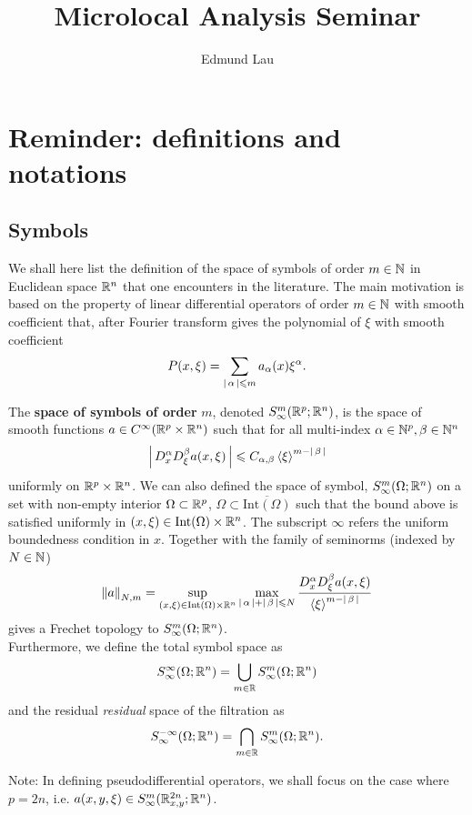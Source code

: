\documentclass{article}
\title{Microlocal Analysis Seminar }
\author{Edmund Lau}
\begin{document}
\maketitle
\tableofcontents
\pagebreak
\section{Reminder: definitions and notations}
\subsection{Symbols} 
We shall here list the definition of the space of symbols of order $m \in \N$  in Euclidean space $\R^n$ that one encounters in the literature. The main motivation is based on the property of linear differential operators of order $m \in \N$ with smooth coefficient that, after Fourier transform gives the polynomial of $\xi$ with smooth coefficient 
\begin{align*}
P(x, \xi) = \sum_{\abs{\alpha} \leq m} a_\alpha(x) \xi^\alpha. 
\end{align*}


\begin{fdefinition}
    The \textbf{space of symbols of order} $m$, denoted $S^m_\infty(\R^p; \R^n)$, is the space of smooth functions $a \in C^\infty(\R^p \times \R^n)$ such that for all multi-index $\alpha \in \N^p, \beta \in \N^n$
    \begin{align*}
    \abs{D^\alpha_x D^\beta_\xi a (x, \xi)} \leq C_{\alpha, \beta} \sym[\xi]^{m - \abs{\beta}} 
    \end{align*}
    uniformly on $\R^p \times \R^n$. We can also defined the space of symbol, $S^m_\infty(\Omega; \R^n)$ on a set with non-empty interior $\Omega \subset \R^p$, $\Omega \subset \overline{\mathrm{Int}(\Omega)}$ such that the bound above is satisfied uniformly in $(x, \xi) \in \mathrm{Int}(\Omega) \times \R^n$. The subscript $\infty$ refers the uniform boundedness condition in $x$. Together with the family of seminorms (indexed by $N \in \N$) 
    \begin{align} \label{eq : symbol seminorms} 
    \norm[a]_{N, m} = \sup_{(x, \xi) \in \mathrm{Int}(\Omega) \times \R^n} \max_{\abs{\alpha} + \abs{\beta} \leq N} \frac{D^\alpha_x D^\beta_\xi a(x, \xi)}{\sym[\xi]^{m - \abs{\beta}}} 
    \end{align}
    gives a Frechet topology to $S^m_\infty(\Omega; \R^n)$. \\
    
    Furthermore, we define the total symbol space as
    \[
    S^\infty_\infty(\Omega; \R^n) = \bigcup_{m \in \R} S^{m}_\infty(\Omega; \R^n)
    \]
    and the residual \emph{residual} space of the filtration as 
    \[
    S^{-\infty}_\infty(\Omega; \R^n) = \bigcap_{m \in \R} S^{m}_\infty(\Omega; \R^n). 
    \]
    
    Note: In defining pseudodifferential operators, we shall focus on the case where $p = 2n$, i.e. $a(x, y, \xi) \in S^{m}_\infty(\R^{2n}_{x,y}; \R^n)$. 
\end{fdefinition}
\end{document}
